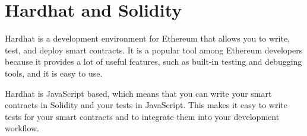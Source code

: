 \chapter{Hardhat and Solidity}

Hardhat is a development environment for Ethereum that allows you to write, test, and deploy smart contracts. It is a popular tool among Ethereum developers because it provides a lot of useful features, such as built-in testing and debugging tools, and it is easy to use.

Hardhat is JavaScript based, which means that you can write your smart contracts in Solidity and your tests in JavaScript. This makes it easy to write tests for your smart contracts and to integrate them into your development workflow.